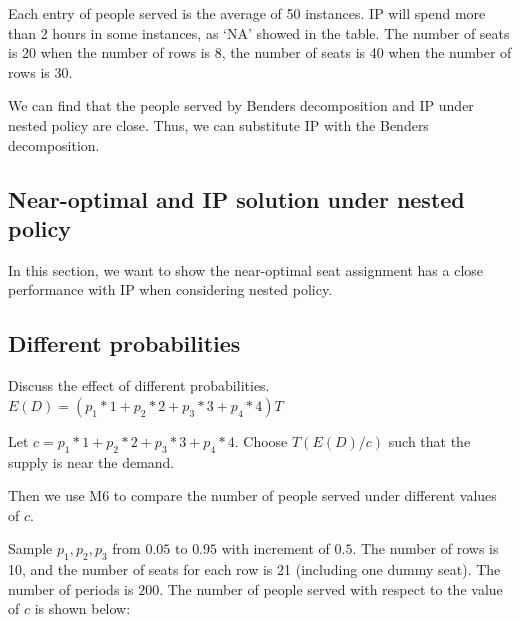 Each entry of people served is the average of 50 instances.
IP will spend more than 2 hours in some instances, as `NA' showed in the table.
The number of seats is 20 when the number of rows is 8, the number of seats is 40 when the number of rows is 30.

We can find that the people served by Benders decomposition and IP under nested policy are close. Thus, we can substitute IP with the Benders decomposition.

\subsection{Near-optimal and IP solution under nested policy}
In this section, we want to show the near-optimal seat assignment has a close performance with IP when considering nested policy.


\subsection{Different probabilities}
Discuss the effect of different probabilities.
$E(D) = (p_1 * 1 + p_2 * 2 + p_3 * 3 + p_4 * 4) T$

Let $c = p_1 * 1 + p_2 * 2 + p_3 * 3 + p_4 * 4$. Choose $T(E(D)/c)$ such that the supply is near the demand. 


Then we use M6 to compare the number of people served under different values of $c$.

Sample $p_1, p_2, p_3$ from $0.05$ to $0.95$ with increment of $0.5$. The number of rows is 10, and the number of seats for each row is 21 (including one dummy seat). The number of periods is $200$. The number of people served with respect to the value of $c$ is shown below:


